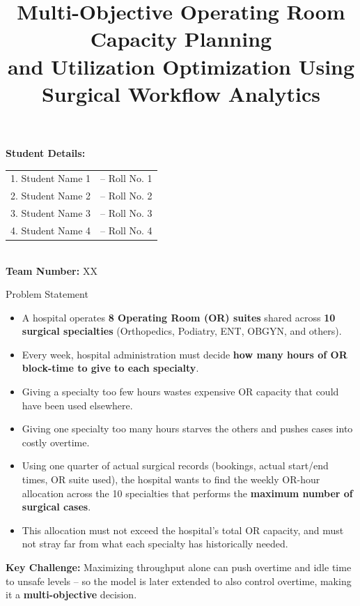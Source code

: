 \documentclass[aspectratio=169]{beamer}
\title[OR Capacity Planning]{Multi-Objective Operating Room Capacity Planning\\ and Utilization Optimization Using Surgical Workflow Analytics}
\author{}
\institute{}
\date{}
\begin{document}
\begin{frame}
    \titlepage
    \vspace{-1.2cm}
    \begin{center}
        \textbf{Student Details:}\\[4pt]
        \begin{tabular}{ll}
        1. Student Name 1 & -- Roll No. 1 \\
        2. Student Name 2 & -- Roll No. 2 \\
        3. Student Name 3 & -- Roll No. 3 \\
        4. Student Name 4 & -- Roll No. 4 \\
        \end{tabular}\\[6pt]
        \textbf{Team Number:} XX
    \end{center}
\end{frame}

\begin{frame}{Problem Statement}
    \begin{itemize}
        \item A hospital operates \textbf{8 Operating Room (OR) suites}
        shared across \textbf{10 surgical specialties} (Orthopedics,
        Podiatry, ENT, OBGYN, and others).
        \item Every week, hospital administration must decide \textbf{how
        many hours of OR block-time to give to each specialty}.
        \item Giving a specialty too few hours wastes expensive OR capacity
        that could have been used elsewhere.
        \item Giving one specialty too many hours starves the others and
        pushes cases into costly overtime.
        \item Using one quarter of actual surgical records (bookings,
        actual start/end times, OR suite used), the hospital wants to find
        the weekly OR-hour allocation across the 10 specialties that
        performs the \textbf{maximum number of surgical cases}.
        \item This allocation must not exceed the hospital's total OR
        capacity, and must not stray far from what each specialty has
        historically needed.
    \end{itemize}
    \vspace{6pt}
    \textbf{Key Challenge:} Maximizing throughput alone can push overtime and
    idle time to unsafe levels -- so the model is later extended to also
    control overtime, making it a \textbf{multi-objective} decision.
\end{frame}
\end{document}

